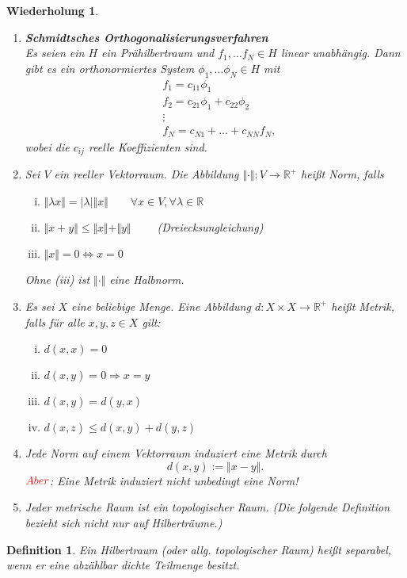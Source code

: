\documentclass[12pt,titlepage]{article}
\newtheorem{definition}[zahl]{Definition}
\numberwithin{equation}{section}
\newtheorem{wiederholung}[zahl]{Wiederholung}
\begin{document}
\begin{wiederholung}
\begin{enumerate}
\item \textbf{Schmidtsches Orthogonalisierungsverfahren}\\
Es seien ein $H$ ein Prähilbertraum und $f_1, \ldots f_N \in H$ linear unabhängig. Dann gibt es ein orthonormiertes System $\phi_1,\ldots \phi_N \in H$ mit 
\begin{align*}
&f_1=c_{11}\phi_1\\
&f_2=c_{21}\phi_1+ c_{22}\phi_2\\
&\vdots\\
&f_N=c_{N1}+\ldots+c_{NN}f_N,
\end{align*}
wobei die $c_{ij}$ reelle Koeffizienten sind.
\item Sei $V$ ein reeller Vektorraum. Die Abbildung $\Vert \cdot \Vert:V\to \mathbb{R}^+$ heißt Norm, falls 
\begin{enumerate}[(i)]
\item $\Vert\lambda x \Vert =\vert \lambda \vert \Vert x\Vert \qquad \forall x \in V, \forall \lambda \in \mathbb{R}$
\item $\Vert x+y\Vert\leq \Vert x \Vert+\Vert y\Vert\qquad$ (Dreiecksungleichung)
\item $\Vert x\Vert=0 \Leftrightarrow x=0$
\end{enumerate}
Ohne (iii) ist $\Vert \cdot\Vert$ eine Halbnorm.
\item Es sei $X$ eine beliebige Menge. Eine Abbildung $d:X \times X \to \mathbb{R}^+$ heißt Metrik, falls für alle $x,y,z \in X$ gilt:
\begin{enumerate}[(i)]
\item $d(x,x)=0$
\item $d(x,y)=0 \Rightarrow x=y$
\item $d(x,y)=d(y,x)$
\item $d(x,z)\leq d(x,y)+d(y,z)$
\end{enumerate}
\item Jede Norm auf einem Vektorraum induziert eine Metrik durch 
\[
d(x,y):=\Vert x-y\Vert.
\]
$\textcolor{red}{Aber}$: Eine Metrik induziert nicht unbedingt eine Norm!
\item Jeder metrische Raum ist ein topologischer Raum. (Die folgende Definition bezieht sich nicht nur auf Hilberträume.) 
\end{enumerate}
\end{wiederholung}
\begin{definition}
Ein Hilbertraum (oder allg. topologischer Raum) heißt separabel, wenn er eine abzählbar dichte Teilmenge besitzt.
\end{definition}
\end{document}
